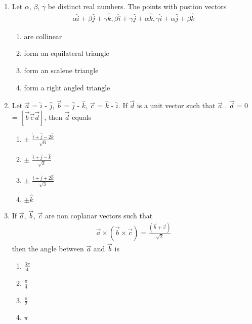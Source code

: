 \begin{enumerate}[label=\arabic*.,ref=\thesubsection.\theenumi]
\item Let $\alpha$, $\beta$, $\gamma$ be distinct real numbers. The points with postion vectors 
\begin{align*}
\alpha \hat{i} + \beta \hat{j} + \gamma \hat{k}, \beta \hat{i} + \gamma \hat{j} + \alpha \hat{k}, 
\gamma \hat{i} + \alpha \hat{j} + \beta \hat{k}
\end{align*}
\begin{enumerate}
\item are collinear
\item form an equilateral triangle
\item form an scalene triangle
\item form a right angled triangle
\end{enumerate}

\item Let $\overrightarrow{a}$ = $\hat{i}$ - $\hat{j}$, $\overrightarrow{b}$ = $\hat{j}$ - $\hat{k}$, 
$\overrightarrow{c}$ = $\hat{k}$ - $\hat{i}$. If $\overrightarrow{d}$ is a unit vector such that 
$\overrightarrow{a}$ . $\overrightarrow{d}$ = 0 = $[\overrightarrow{b} \overrightarrow{c} \overrightarrow{d}]$, then $\overrightarrow{d}$ equals
\begin{enumerate}
\item $\pm$ $\frac{\hat{i} + \hat{j} - 2\hat{k}}{\sqrt{6}}$
\item $\pm$ $\frac{\hat{i} + \hat{j} - \hat{k}}{\sqrt{3}}$
\item $\pm$ $\frac{\hat{i} + \hat{j} + 2\hat{k}}{\sqrt{3}}$
\item $\pm \hat{k}$
\end{enumerate}

\item If $\overrightarrow{a}$, $\overrightarrow{b}$, $\overrightarrow{c}$ are non coplanar vectors such that 
\begin{align*}
\overrightarrow{a} \times (\overrightarrow{b} \times \overrightarrow{c}) = \frac{(\overrightarrow{b} + \overrightarrow{c})}{\sqrt{2}}
\end{align*}
then the angle between $\overrightarrow{a}$ and $\overrightarrow{b}$ is
\begin{enumerate}
\item $\frac{3\pi}{4}$
\item $\frac{\pi}{4}$
\item $\frac{\pi}{2}$
\item $\pi$
\end{enumerate}


\end{enumerate}
